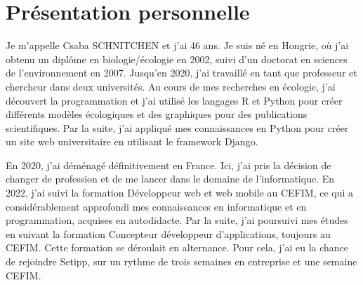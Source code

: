 \section{Présentation personnelle}\label{sec:presentation-personnelle}


Je m'appelle Csaba SCHNITCHEN et j'ai 46 ans. Je suis né en Hongrie, où j'ai obtenu un diplôme en biologie/écologie en 2002, suivi d'un doctorat en sciences de l'environnement en 2007. Jusqu'en 2020, j'ai travaillé en tant que professeur et chercheur dans deux universités. Au cours de mes recherches en écologie, j'ai découvert la programmation et j'ai utilisé les langages R et Python pour créer différents modèles écologiques et des graphiques pour des publications scientifiques. Par la suite, j'ai appliqué mes connaissances en Python pour créer un site web universitaire en utilisant le framework Django.

En 2020, j'ai déménagé définitivement en France. Ici, j'ai pris la décision de changer de profession et de me lancer dans le domaine de l'informatique. En 2022, j'ai suivi la formation Développeur web et web mobile au CEFIM, ce qui a considérablement approfondi mes connaissances en informatique et en programmation, acquises en autodidacte. Par la suite, j'ai poursuivi mes études en suivant la formation Concepteur développeur d'applications, toujours au CEFIM. Cette formation se déroulait en alternance. Pour cela, j'ai eu la chance de rejoindre Setipp, sur un rythme de trois semaines en entreprise et une semaine CEFIM.
